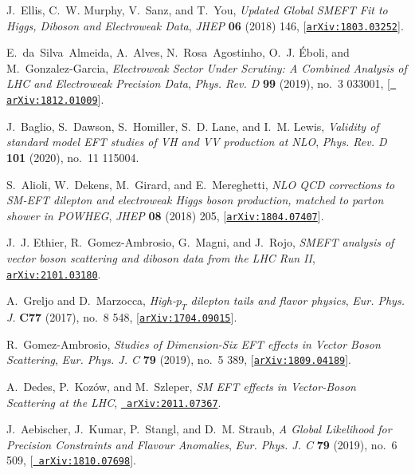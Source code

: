 \documentclass[11pt,a4paper]{article}
\numberwithin{equation}{section}
\numberwithin{figure}{section}
\numberwithin{table}{section}
\begin{document}
\begin{thebibliography}{100}
J.~Ellis, C.~W. Murphy, V.~Sanz, and T.~You, {\it {Updated Global SMEFT Fit to
  Higgs, Diboson and Electroweak Data}},  {\em JHEP} {\bf 06} (2018) 146,
  [\href{http://arxiv.org/abs/1803.03252}{{\tt arXiv:1803.03252}}].

E.~da~Silva~Almeida, A.~Alves, N.~Rosa~Agostinho, O.~J. \'Eboli, and
  M.~Gonzalez-Garcia, {\it {Electroweak Sector Under Scrutiny: A Combined
  Analysis of LHC and Electroweak Precision Data}},  {\em Phys. Rev. D} {\bf
  99} (2019), no.~3 033001, [\href{http://arxiv.org/abs/1812.01009}{{\tt
  arXiv:1812.01009}}].

J.~Baglio, S.~Dawson, S.~Homiller, S.~D. Lane, and I.~M. Lewis, {\it {Validity
  of standard model EFT studies of VH and VV production at NLO}},  {\em Phys.
  Rev. D} {\bf 101} (2020), no.~11 115004.

S.~Alioli, W.~Dekens, M.~Girard, and E.~Mereghetti, {\it {NLO QCD corrections
  to SM-EFT dilepton and electroweak Higgs boson production, matched to parton
  shower in POWHEG}},  {\em JHEP} {\bf 08} (2018) 205,
  [\href{http://arxiv.org/abs/1804.07407}{{\tt arXiv:1804.07407}}].

J.~J. Ethier, R.~Gomez-Ambrosio, G.~Magni, and J.~Rojo, {\it {SMEFT analysis of
  vector boson scattering and diboson data from the LHC Run II}},
  \href{http://arxiv.org/abs/2101.03180}{{\tt arXiv:2101.03180}}.

A.~Greljo and D.~Marzocca, {\it {High-$p_T$ dilepton tails and flavor
  physics}},  {\em Eur. Phys. J.} {\bf C77} (2017), no.~8 548,
  [\href{http://arxiv.org/abs/1704.09015}{{\tt arXiv:1704.09015}}].

R.~Gomez-Ambrosio, {\it {Studies of Dimension-Six EFT effects in Vector Boson
  Scattering}},  {\em Eur. Phys. J. C} {\bf 79} (2019), no.~5 389,
  [\href{http://arxiv.org/abs/1809.04189}{{\tt arXiv:1809.04189}}].

A.~Dedes, P.~Koz\'ow, and M.~Szleper, {\it {SM EFT effects in Vector-Boson
  Scattering at the LHC}},  \href{http://arxiv.org/abs/2011.07367}{{\tt
  arXiv:2011.07367}}.

J.~Aebischer, J.~Kumar, P.~Stangl, and D.~M. Straub, {\it {A Global Likelihood
  for Precision Constraints and Flavour Anomalies}},  {\em Eur. Phys. J. C}
  {\bf 79} (2019), no.~6 509, [\href{http://arxiv.org/abs/1810.07698}{{\tt
  arXiv:1810.07698}}].


\end{thebibliography}
\end{document}
